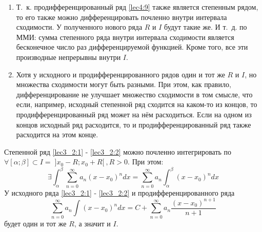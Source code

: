 \documentclass[../../main.tex]{subfiles}
\begin{document}
\begin{rems}
	\;
	
	\begin{enumerate}
		\item Т.~к. продифференцированный ряд \eqref{lec4:9} также 
		является степенным рядом, то его также можно дифференцировать
		почленно внутри интервала сходимости. У полученного нового 
		ряда $R$ и $I$ будут такие же. И т.~д. по ММИ: сумма 
		степенного ряда внутри интервала сходимости является 
		бесконечное число раз дифференцируемой функцией. Кроме 
		того, все эти производные непрерывны внутри $I$.
		
		\item Хотя у исходного и продифференцированного рядов один
		и тот же $R$ и $I$, но множества сходимости могут быть разными.
		При этом, как правило, дифференцирование не улучшает
		множество сходимости в том смысле, что если, например, 
		исходный степенной ряд сходится на каком-то из концов, то
		продифференцированный ряд может на нём расходиться. 
		Если на одном из концов исходный ряд расходится, 
		то и продифференцированный ряд также расходится на этом конце. 
	\end{enumerate}
\end{rems}

\begin{thm}
	Степенной ряд \eqref{lec3_2:1} - \eqref{lec3_2:2} можно почленно 
	интегрировать по $\forall [\alpha; \beta] \subset I = \;
	]x_0 - R;x_0 + R[ \:, R > 0 $. При этом:
	\begin{equation} \label{lec4:11}
		\exists \int_{\alpha}^{\beta} \sum\limits_{n = 0}^{\infty}
		a_n(x - x_0)^n dx = \sum\limits_{n = 0}^{\infty} a_n
		\int_{\alpha}^{\beta} (x - x_0)^n dx
	\end{equation}
	У исходного ряда \eqref{lec3_2:1} - \eqref{lec3_2:2} и продифференцированного
	ряда 
	\begin{equation} \label{lec4:12}
		\sum\limits_{n = 0}^{\infty} a_n \int (x - x_0)^n dx =
		C + \sum\limits_{n = 0}^{\infty} a_n 
		\dfrac{ (x - x_0)^{n + 1} }{n + 1}
	\end{equation}
	будет один и тот же $R$, а значит и $I$. 
\end{thm}
\end{document}
